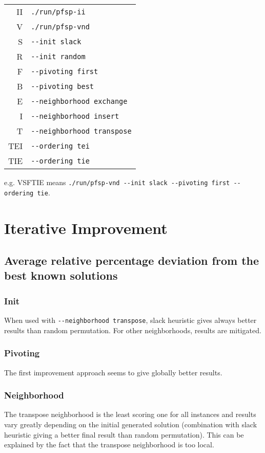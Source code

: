 \documentclass[a4paper,12pt]{article}
\begin{document}
\begin{tabular}{rl}
II & \verb!./run/pfsp-ii!\\
V  & \verb!./run/pfsp-vnd!\\
S  & \verb!--init slack!\\
R  & \verb!--init random!\\
F  & \verb!--pivoting first!\\
B  & \verb!--pivoting best!\\
E  & \verb!--neighborhood exchange!\\
I  & \verb!--neighborhood insert!\\
T  & \verb!--neighborhood transpose!\\
TEI  & \verb!--ordering tei!\\
TIE  & \verb!--ordering tie!\\
\end{tabular}

e.g. VSFTIE means \verb!./run/pfsp-vnd --init slack --pivoting first --ordering tie!.
\newpage\cleardoublepage{}
\section{Iterative Improvement}

\subsection{Average relative percentage deviation from the best known solutions}

\subsubsection{Init}

When used with \verb!--neighborhood transpose!, slack heuristic gives always better results than random permutation. For other neighborhoods, results are mitigated.

\subsubsection{Pivoting}

The first improvement approach seems to give globally better results.

\subsubsection{Neighborhood}

The transpose neighborhood is the least scoring one for all instances and results vary greatly depending on the initial generated solution (combination with slack heuristic giving a better final result than random permutation). This can be explained by the fact that the transpose neighborhood is too local.
\end{document}
